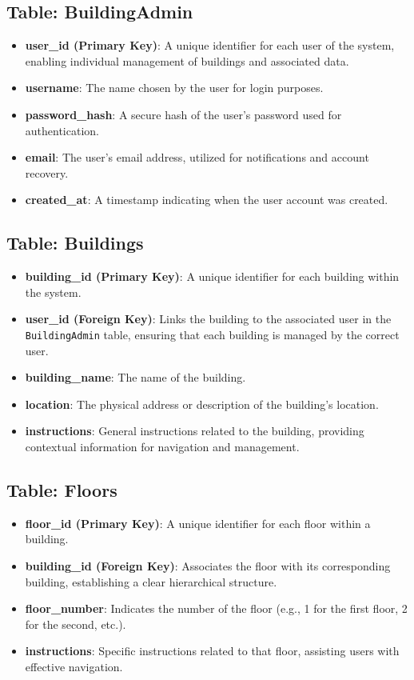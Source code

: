 \subsection{Table: BuildingAdmin}  
\begin{itemize}
	\item \textbf{user\_id (Primary Key)}: A unique identifier for each user of the system, enabling individual management of buildings and associated data.
	\item \textbf{username}: The name chosen by the user for login purposes.
	\item \textbf{password\_hash}: A secure hash of the user's password used for authentication.
	\item \textbf{email}: The user's email address, utilized for notifications and account recovery.
	\item \textbf{created\_at}: A timestamp indicating when the user account was created.
\end{itemize}

\subsection{Table: Buildings}  
\begin{itemize}
	\item \textbf{building\_id (Primary Key)}: A unique identifier for each building within the system.
	\item \textbf{user\_id (Foreign Key)}: Links the building to the associated user in the \texttt{BuildingAdmin} table, ensuring that each building is managed by the correct user.
	\item \textbf{building\_name}: The name of the building.
	\item \textbf{location}: The physical address or description of the building's location.
	\item \textbf{instructions}: General instructions related to the building, providing contextual information for navigation and management.
\end{itemize}

\subsection{Table: Floors}  
\begin{itemize}
	\item \textbf{floor\_id (Primary Key)}: A unique identifier for each floor within a building.
	\item \textbf{building\_id (Foreign Key)}: Associates the floor with its corresponding building, establishing a clear hierarchical structure.
	\item \textbf{floor\_number}: Indicates the number of the floor (e.g., 1 for the first floor, 2 for the second, etc.).
	\item \textbf{instructions}: Specific instructions related to that floor, assisting users with effective navigation.
\end{itemize}

